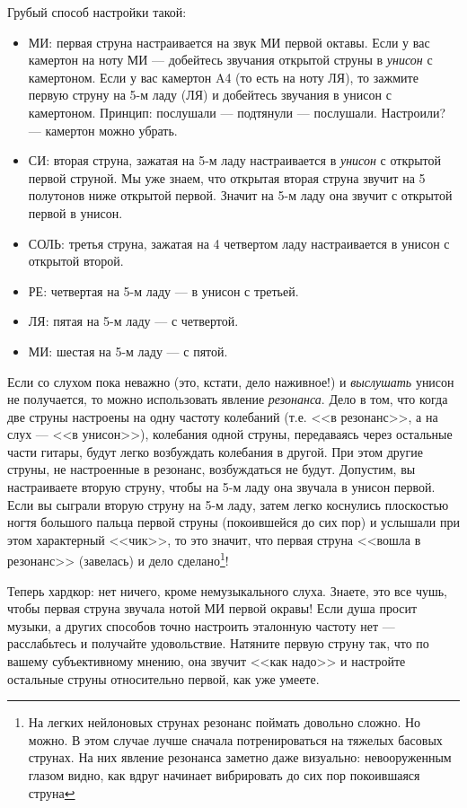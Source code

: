 Грубый способ настройки такой:
\begin{itemize}
    \item МИ: первая струна настраивается на звук МИ первой октавы. Если у вас камертон на ноту МИ --- добейтесь звучания открытой струны в \emph{унисон} с камертоном. Если у вас камертон A4 (то есть на ноту ЛЯ), то зажмите первую струну на 5-м ладу (ЛЯ) и добейтесь звучания в унисон с камертоном. Принцип: послушали --- подтянули --- послушали. Настроили? --- камертон можно убрать.
    \item СИ: вторая струна, зажатая на 5-м ладу настраивается в \emph{унисон} с открытой первой струной. Мы уже знаем, что открытая вторая струна звучит на 5 полутонов ниже открытой первой. Значит на 5-м ладу она звучит с открытой первой в унисон.
    \item СОЛЬ: третья струна, зажатая на 4 четвертом ладу настраивается в унисон с открытой второй.
    \item РЕ: четвертая на 5-м ладу --- в унисон с третьей.
    \item ЛЯ: пятая на 5-м ладу --- с четвертой.
    \item МИ: шестая на 5-м ладу --- с пятой.
\end{itemize}

Если со слухом пока неважно (это, кстати, дело наживное!) и \emph{выслушать} унисон не получается, то можно использовать явление \emph{резонанса}. Дело в том, что когда две струны настроены на одну частоту колебаний (т.е. <<в резонанс>>, а на слух --- <<в унисон>>), колебания одной струны, передаваясь через остальные части гитары, будут легко возбуждать колебания в другой. При этом другие струны, не настроенные в резонанс, возбуждаться не будут. Допустим, вы настраиваете вторую струну, чтобы на 5-м ладу она звучала в унисон первой. Если вы сыграли вторую струну на 5-м ладу, затем легко коснулись плоскостью ногтя большого пальца первой струны (покоившейся до сих пор) и услышали при этом характерный <<чик>>, то это значит, что первая струна <<вошла в резонанс>> (завелась) и дело сделано\footnote{На легких нейлоновых струнах резонанс поймать довольно сложно. Но можно. В этом случае лучше сначала потренироваться на тяжелых басовых струнах. На них явление резонанса заметно даже визуально: невооруженным глазом видно, как вдруг начинает вибрировать до сих пор покоившаяся струна}!

Теперь хардкор: нет ничего, кроме немузыкального слуха. Знаете, это все чушь, чтобы первая струна звучала нотой МИ первой окравы! Если душа просит музыки, а других способов точно настроить эталонную частоту нет --- расслабьтесь и получайте удовольствие. Натяните первую струну так, что по вашему субъективному мнению, она звучит <<как надо>> и настройте остальные струны относительно первой, как уже умеете.

